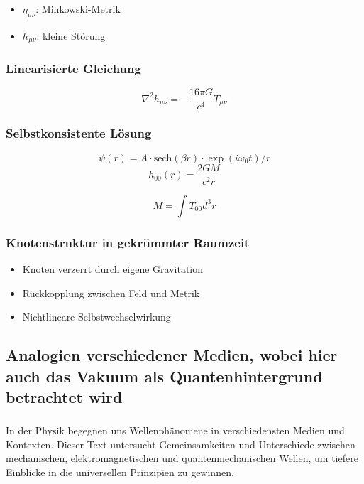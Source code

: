 \documentclass[12pt,a4paper]{article}
\begin{document}
	\begin{itemize}
		\item $\eta_{\mu\nu}$: Minkowski-Metrik
		\item $h_{\mu\nu}$: kleine Störung
	\end{itemize}
	
	\subsubsection{Linearisierte Gleichung}
	\begin{equation}
		\nabla^2 h_{\mu\nu} = -\frac{16\pi G}{c^4} T_{\mu\nu}
	\end{equation}
	
	\subsubsection{Selbstkonsistente Lösung}
	\begin{equation}
		\psi(r) = A \cdot \text{sech}(\beta r) \cdot \exp(i\omega_0 t)/r
	\end{equation}
	\begin{equation}
		h_{00}(r) = \frac{2GM}{c^2 r}
	\end{equation}
	
	\begin{equation}
		M = \int T_{00} d^3r
	\end{equation}
	
	\subsubsection{Knotenstruktur in gekrümmter Raumzeit}
	\begin{itemize}
		\item Knoten verzerrt durch eigene Gravitation
		\item Rückkopplung zwischen Feld und Metrik
		\item Nichtlineare Selbstwechselwirkung
	\end{itemize}
	
	
	
	\subsection{Analogien verschiedener Medien, wobei hier auch das Vakuum als Quantenhintergrund betrachtet wird}
	
	\subsubsection{}
	In der Physik begegnen uns Wellenphänomene in verschiedensten Medien und Kontexten. Dieser Text untersucht Gemeinsamkeiten und Unterschiede zwischen mechanischen, elektromagnetischen und quantenmechanischen Wellen, um tiefere Einblicke in die universellen Prinzipien zu gewinnen.
	
\end{document}
